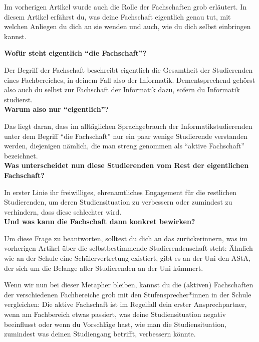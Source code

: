 {Im vorherigen Artikel wurde auch die Rolle der Fachschaften grob erläutert. In diesem Artikel erfährst du, was deine Fachschaft eigentlich genau tut, mit welchen Anliegen du dich an sie wenden und auch, wie du dich selbst einbringen kannst.
}{
    \textbf{Wofür steht eigentlich "`die Fachschaft"'?}

    Der Begriff der Fachschaft beschreibt eigentlich die Gesamtheit der Studierenden eines Fachbereiches, in deinem Fall also der Informatik. Dementsprechend gehörst also auch du selbst zur Fachschaft der Informatik dazu, sofern du Informatik studierst.\\

    \textbf{Warum also nur "`eigentlich"'?}

    Das liegt daran, dass im alltäglichen Sprachgebrauch der Informatikstudierenden  unter dem Begriff "`die Fachschaft"' nur ein paar wenige Studierende verstanden werden, diejenigen nämlich, die man streng genommen als "`aktive Fachschaft"' bezeichnet.\\

    \textbf{Was unterscheidet nun diese Studierenden vom Rest der eigentlichen Fachschaft?}

    In erster Linie ihr freiwilliges, ehrenamtliches Engagement für die restlichen Studierenden, um deren Studiensituation zu verbessern oder zumindest zu verhindern, dass diese schlechter wird.\\

    \textbf{Und was kann die Fachschaft dann konkret bewirken?}

    Um diese Frage zu beantworten, solltest du dich an das zurückerinnern, was im vorherigen Artikel über die selbstbestimmende Studierendenschaft steht: Ähnlich wie an der Schule eine Schülervertretung existiert, gibt es an der Uni den AStA, der sich um die Belange aller Studierenden an der Uni kümmert.

    Wenn wir nun bei dieser Metapher bleiben, kannst du die (aktiven) Fachschaften der verschiedenen Fachbereiche grob mit den Stufensprecher*innen in der Schule vergleichen: Die aktive Fachschaft ist im Regelfall dein erster Ansprechpartner, wenn am Fachbereich etwas passiert, was deine Studiensituation negativ beeinflusst oder wenn du Vorschläge hast, wie man die Studiensituation, zumindest was deinen Studiengang betrifft, verbessern könnte.

}
